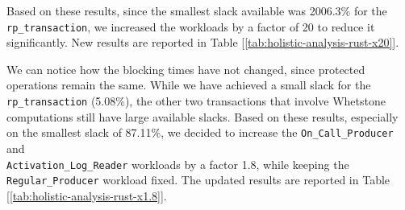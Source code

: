 Based on these results, since the smallest slack available was 2006.3\% for the 
\texttt{rp\_transaction}, we increased the workloads by a factor of 20 to
reduce it significantly. New results are reported in Table
[\ref{tab:holistic-analysis-rust-x20}]. 
\begin{table}[H]
  \caption{Holistic Analysis Results Rust x20}
  \label{tab:holistic-analysis-rust-x20}
\end{table}
We can notice how the blocking times have not changed, since protected operations
remain the same. While we have achieved a small slack for the
\texttt{rp\_transaction} (5.08\%), the other two transactions that involve
Whetstone computations still have large available slacks. Based on these
results, especially on the smallest slack of 87.11\%, we decided to increase the
\texttt{On\_Call\_Producer} and \\
\texttt{Activation\_Log\_Reader} workloads by a factor 1.8, while keeping the
\texttt{Regular\_Producer} workload fixed. The updated results are reported in
Table [\ref{tab:holistic-analysis-rust-x1.8}].  
